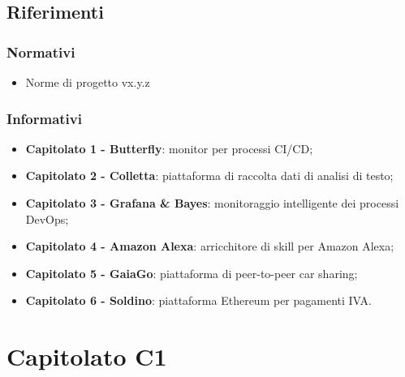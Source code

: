 \documentclass[11pt,a4paper]{article}
\begin{document}
	\subsection{Riferimenti}
		\subsubsection{Normativi}
		\begin{itemize}
		\item Norme di progetto vx.y.z
		\end{itemize}
		\subsubsection{Informativi}
		\begin{itemize}
		\item\textbf{Capitolato 1 - Butterfly}: monitor per processi CI/CD;
		\item\textbf{Capitolato 2 - Colletta}: piattaforma di raccolta dati di analisi di testo;
		\item\textbf{Capitolato 3 - Grafana \& Bayes}: monitoraggio intelligente dei processi DevOps;
		\item\textbf{Capitolato 4 - Amazon Alexa}: arricchitore di skill per Amazon Alexa;
		\item\textbf{Capitolato 5 - GaiaGo}: piattaforma di peer-to-peer car sharing;
		\item\textbf{Capitolato 6 - Soldino}: piattaforma Ethereum per pagamenti IVA. 
		\end{itemize}
	
	\newpage	
	\section{Capitolato C1}
\end{document}
